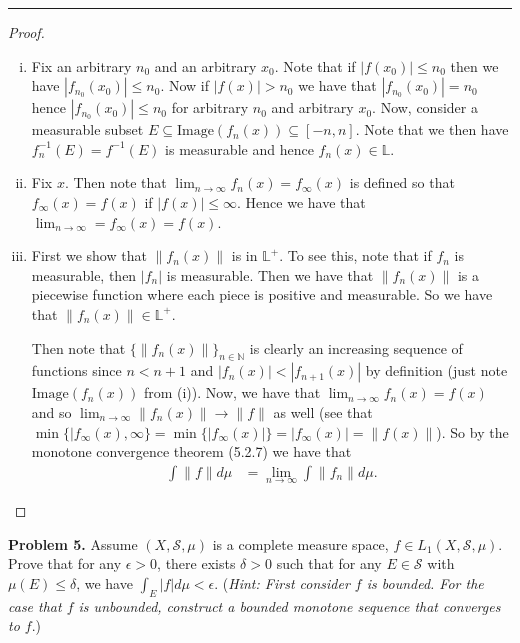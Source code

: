 \documentclass[leqno]{article}
\theoremstyle{nonumberplain}
\newtheorem{proof}{Proof}
\newcommand{\N}{\mathbb{N}}
\newcommand{\Sets}{\mathcal{S}}
\begin{document}
\noindent\rule[0.5ex]{\linewidth}{1pt}


\begin{proof}~
\begin{enumerate}[(i)]
\item Fix an arbitrary $n_0$ and an arbitrary $x_0$.  Note that if $|f(x_0)|\leq n_0$ then we have $|f_{n_0}(x_0)|\leq n_0$.  Now if $|f(x)|>n_0$ we have that $|f_{n_0}(x_0)|=n_0$ hence $|f_{n_0}(x_0)|\leq n_0$ for arbitrary $n_0$ and arbitrary $x_0$.  Now, consider a measurable subset $E\subseteq \textrm{Image}(f_n(x))\subseteq [-n,n]$. Note that we then have $f_n^{-1}(E)=f^{-1}(E)$ is measurable and hence $f_n(x)\in \mathbb{L}$.
\item Fix $x$.  Then note that $\lim_{n\to \infty} f_n(x)=f_\infty(x)$ is defined so that $f_\infty(x)=f(x)$ if $|f(x)|\leq \infty$.  Hence we have that $\lim_{n\to \infty}=f_\infty(x)=f(x)$. 
\item First we show that $\|f_n(x)\|$ is in $\mathbb{L}^+$. To see this, note that if $f_n$ is measurable, then $|f_n|$ is measurable.  Then we have that $\|f_n(x)\|$ is a piecewise function where each piece is positive and measurable. So we have that $\|f_n(x)\|\in \mathbb{L}^+$.

Then note that $\{\|f_n(x)\|\}_{n\in \N}$ is clearly an increasing sequence of functions since $n<n+1$ and $|f_n(x)|<|f_{n+1}(x)|$ by definition (just note $\textrm{Image}(f_n(x))$ from (i)).  Now, we have that $\lim_{n\to \infty} f_n(x)=f(x)$ and so $\lim_{n\to \infty}\|f_n(x)\|\to \|f\|$ as well (see that $\min\{|f_\infty(x),\infty\}=\min\{|f_\infty(x)|\}=|f_\infty(x)|=\|f(x)\|$). So by the monotone convergence theorem (5.2.7) we have that
\begin{align*}
\int \|f\|d\mu &= \lim_{n\to \infty} \int \|f_n\|d\mu.
\end{align*}
\end{enumerate}
\end{proof}

\pagebreak




\noindent\textbf{Problem 5.} \quad
Assume $(X,\Sets,\mu)$ is a complete measure space, $f\in L_1(X,\Sets,\mu)$. Prove that for any $\epsilon>0$, there exists $\delta>0$ such that for any $E\in \Sets$ with $\mu(E)\leq \delta$, we have $\displaystyle{\int_E |f|d\mu <\epsilon}$. (\emph{Hint: First consider $f$ is bounded. For the case that $f$ is unbounded, construct a bounded monotone sequence that converges to $f$}.)
\end{document}
